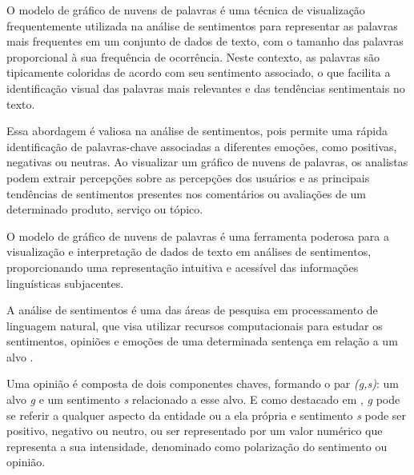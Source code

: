 O modelo de gráfico de nuvens de palavras é uma técnica de visualização frequentemente utilizada na análise de sentimentos para representar as palavras mais frequentes em um conjunto de dados de texto, com o tamanho das palavras proporcional à sua frequência de ocorrência. Neste contexto, as palavras são tipicamente coloridas de acordo com seu sentimento associado, o que facilita a identificação visual das palavras mais relevantes e das tendências sentimentais no texto.

Essa abordagem é valiosa na análise de sentimentos, pois permite uma rápida identificação de palavras-chave associadas a diferentes emoções, como positivas, negativas ou neutras. Ao visualizar um gráfico de nuvens de palavras, os analistas podem extrair percepções sobre as percepções dos usuários e as principais tendências de sentimentos presentes nos comentários ou avaliações de um determinado produto, serviço ou tópico.

O modelo de gráfico de nuvens de palavras é uma ferramenta poderosa para a visualização e interpretação de dados de texto em análises de sentimentos, proporcionando uma representação intuitiva e acessível das informações linguísticas subjacentes.

A análise de sentimentos é uma das áreas de pesquisa em processamento de linguagem natural, que visa utilizar recursos computacionais para estudar os sentimentos, opiniões e emoções de uma determinada sentença em relação a um alvo \cite{Bellini2019}.

Uma opinião é composta de dois componentes chaves, formando o par \emph{(g,s)}: um alvo \emph{g} e um sentimento \emph{s} relacionado a esse alvo. E como destacado em \cite{Machado2018}, \emph{g} pode se referir a qualquer aspecto da entidade ou a ela própria e sentimento \emph{s} pode ser positivo, negativo ou neutro, ou ser representado por um valor numérico que representa a sua intensidade, denominado como polarização do sentimento ou opinião.


